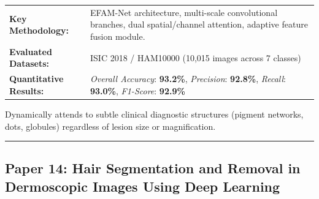 \documentclass[10pt,a4paper]{article}
\begin{document}
\vspace{4pt}
\begin{tabularx}{\linewidth}{p{3.2cm}X}
\toprule
\textbf{Key Methodology:} & EFAM-Net architecture, multi-scale convolutional branches, dual spatial/channel attention, adaptive feature fusion module. \\
\textbf{Evaluated Datasets:} & ISIC 2018 / HAM10000 (10,015 images across 7 classes) \\
\textbf{Quantitative Results:} & \textit{Overall Accuracy}: \textbf{93.2\%}, \textit{Precision}: \textbf{92.8\%}, \textit{Recall}: \textbf{93.0\%}, \textit{F1-Score}: \textbf{92.9\%} \\
\bottomrule
\end{tabularx}
\vspace{4pt}
\begin{tcolorbox}[utilitybox,title=Clinical Utility and Real-World Impact]
Dynamically attends to subtle clinical diagnostic structures (pigment networks, dots, globules) regardless of lesion size or magnification.
\end{tcolorbox}
\vspace{12pt}
\hrule
\vspace{12pt}
\subsection*{Paper 14: Hair Segmentation and Removal in Dermoscopic Images Using Deep Learning}
\end{document}
